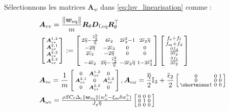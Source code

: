 \begin{algorithm}
\begin{algorithmic}[1]
\State Sélectionnons les matrices $\boldsymbol{A}_w$ dans \eqref{eq:lpv_linearisation} comme :
\begin{align}
\label{eq:Avv_alg2}
& \boldsymbol{A}_{vv} =
\frac{\| \boldsymbol{w}_{\mathrm{eq}} \| }{m} 
 \boldsymbol{R}_\theta \boldsymbol{D}_{\text{f,eq}}  \boldsymbol{R}_\theta^\top \\
\nonumber
&\smallmat{\boldsymbol{A}_{v\epsilon}^{1,2} \\ 
 \boldsymbol{A}_{v\epsilon}^{2,1} \\ \boldsymbol{A}_{v\epsilon}^{2,3} \\ \boldsymbol{A}_{v\epsilon}^{3,2}}
      := \smallmat{ 2 \overline{\eta}  - \frac{\overline \epsilon_{2}^{2}}{\overline{\eta} }  & 4 \overline \epsilon_{2} &  2\overline \epsilon_{2}^{2} -1 & 2\overline \epsilon_{2} \overline{\eta} \\
     -2 \overline{\eta}  & -2 \overline \epsilon_{2} & 0 & 0 \\ 
      2 \overline \epsilon_{2} & -2 \overline{\eta}  & 0 & 0 \\
      -4 \overline \epsilon_{2} & 2 \overline{\eta}  - \frac{\overline \epsilon_{2}^{2}}{\overline{\eta} } & -2\overline \epsilon_{2} \overline{\eta}  & 1- 2\overline \epsilon_{2}^{2}   }\smallmat{ f_{\text{e}}  + f_{\ell}  \\ f_{\text{m}}  + f_{\text{d}}  \\ \frac{\partial  f_{\text{d}}  }{\partial \overline \epsilon_{2}} \\ \frac{\partial  f_{\ell}  }{\partial \overline \epsilon_{2}}}\\
\label{eq:Aveps_derivation_ALG}
&  \boldsymbol{A}_{v\epsilon} = \frac{1}{m}\smallmat{ 
        0 & \boldsymbol{A}_{v\epsilon}^{1,2} & 0 \\ 
        \boldsymbol{A}_{v\epsilon}^{2,1} & 0 & \boldsymbol{A}_{v\epsilon}^{2,3}  \\
        0 & \boldsymbol{A}_{v\epsilon}^{3,2} & 0
   }, 
   \boldsymbol{A}_{\epsilon \omega} = \frac{\overline{\eta}  }{2} \mathbb{I}_{3} + \frac{\overline \epsilon_{2}}{2}\smallmat{
        0 & 0 &  1 \\ 
        0 & 0 & 0  \\
        \shortminus 1 & 0 & 0
    }\\
\label{eq:ddotomega_deps}
&   \boldsymbol{A}_{ \omega \epsilon} = \tfrac{\rho S C_{\ell} \Delta_{\text{r}}  \lVert \boldsymbol{w}_{\mathrm{eq}} \rVert (w^{\text{b}}_{x} -  \xi_{\text{m}} \delta w^{\text{b}}_{z})}{J_{y} \overline{\eta}  } \smallmat{ 
        0 & 0 & 0 \\ 
        0 & 1  & 0  \\
       0 & 0 & 0
    }
\end{align}


\end{algorithmic}
\end{algorithm}

